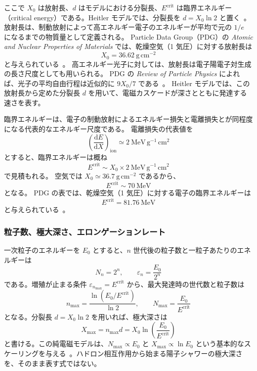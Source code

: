 \documentclass[book,paper=a4,fontsize=11pt]{jlreq}
\begin{document}
ここで \(X_0\) は放射長、\(d\) はモデルにおける分裂長、\(E^\mathrm{crit}\) は臨界エネルギー（critical energy）である。Heitler モデルでは、分裂長を \(d=X_0\ln 2\) と置く~\cite{Matthews2005,Montanus2013}。
放射長は、制動放射によって高エネルギー電子のエネルギーが平均で元の \(1/e\) になるまでの物質量として定義される。
Particle Data Group（PDG）の \textit{Atomic and Nuclear Properties of Materials} では、乾燥空気（1 気圧）に対する放射長は
\begin{equation}
  X_0 = 36.62\ \mathrm{g\,cm^{-2}}
\end{equation}
と与えられている~\cite{PDGAir}。
高エネルギー光子に対しては、放射長は電子陽電子対生成の長さ尺度としても用いられる。
PDG の \textit{Review of Particle Physics} によれば、光子の平均自由行程は近似的に \(9X_0/7\) である~\cite{PDGPassage}。
Heitler モデルでは、この放射長から定めた分裂長 \(d\) を用いて、電磁カスケードが深さとともに発達する速さを表す。

臨界エネルギーは、電子の制動放射によるエネルギー損失と電離損失とが同程度になる代表的なエネルギー尺度である。
電離損失の代表値を
\begin{equation}
  \left(\frac{\mathrm{d}E}{\mathrm{d}X}\right)_{\mathrm{ion}} \simeq 2\ \mathrm{MeV\,g^{-1}\,cm^2}
\end{equation}
とすると、臨界エネルギーは概ね
\begin{equation}
  E^\mathrm{crit} \sim X_0 \times 2\ \mathrm{MeV\,g^{-1}\,cm^2}
\end{equation}
で見積もれる。
空気では \(X_0 \simeq 36.7\ \mathrm{g\,cm^{-2}}\) であるから、
\begin{equation}
  E^\mathrm{crit} \sim 70\ \mathrm{MeV}
\end{equation}
となる。
PDG の表では、乾燥空気（1 気圧）に対する電子の臨界エネルギーは
\begin{equation}
  E^\mathrm{crit} = 81.76\ \mathrm{MeV}
\end{equation}
と与えられている~\cite{PDGAir}。
\subsubsection{粒子数、極大深さ、エロンゲーションレート}
一次粒子のエネルギーを \(E_0\) とすると、\(n\) 世代後の粒子数と一粒子あたりのエネルギーは
\begin{equation}
  N_n=2^n,\qquad \varepsilon_n=\frac{E_0}{2^n}
\end{equation}
である。増殖が止まる条件 \(\varepsilon_{n_{\max}}=E^{\mathrm{crit}}\) から、最大発達時の世代数と粒子数は
\begin{equation}
  n_{\max}=\frac{\ln(E_0/E^{\mathrm{crit}})}{\ln2},
  \qquad N_{\max}=\frac{E_0}{E^{\mathrm{crit}}}
\end{equation}
となる。分裂長 \(d=X_0\ln2\) を用いれば、極大深さは
\begin{equation}
  X_{\max}=n_{\max}d=X_0\ln\!\left(\frac{E_0}{E^{\mathrm{crit}}}\right)
  \label{eq:Xmax}
\end{equation}
と書ける。この純電磁モデルは、\(N_{\max}\propto E_0\) と \(X_{\max}\propto\ln E_0\) という基本的なスケーリングを与える~\cite{Heitler1944,Matthews2005}。ハドロン相互作用から始まる陽子シャワーの極大深さを、そのまま表す式ではない。
\end{document}
